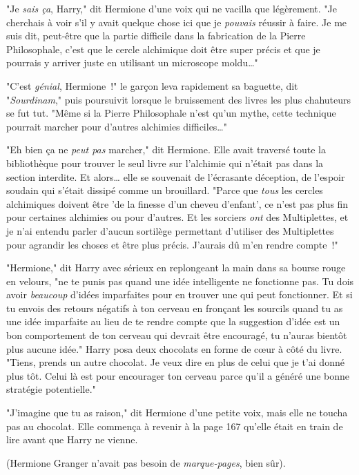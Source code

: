 "Je \emph{sais ça}, Harry," dit Hermione d'une voix qui ne vacilla que légèrement. "Je cherchais à voir s'il y avait quelque chose ici que je \emph{pouvais} réussir à faire. Je me suis dit, peut-être que la partie difficile dans la fabrication de la Pierre Philosophale, c'est que le cercle alchimique doit être super précis et que je pourrais y arriver juste en utilisant un microscope moldu…"

"C'est \emph{génial}, Hermione~!" le garçon leva rapidement sa baguette, dit "\emph{Sourdinam}," puis poursuivit lorsque le bruissement des livres les plus chahuteurs se fut tut. "Même si la Pierre Philosophale n'est qu'un mythe, cette technique pourrait marcher pour d'autres alchimies difficiles…"

"Eh bien ça ne \emph{peut pas} marcher," dit Hermione. Elle avait traversé toute la bibliothèque pour trouver le seul livre sur l'alchimie qui n'était pas dans la section interdite. Et alors… elle se souvenait de l'écrasante déception, de l'espoir soudain qui s'était dissipé comme un brouillard. "Parce que \emph{tous} les cercles alchimiques doivent être 'de la finesse d'un cheveu d'enfant', ce n'est pas plus fin pour certaines alchimies ou pour d'autres. Et les sorciers \emph{ont} des Multiplettes, et je n'ai entendu parler d'aucun sortilège permettant d'utiliser des Multiplettes pour agrandir les choses et être plus précis. J'aurais dû m'en rendre compte~!"

"Hermione," dit Harry avec sérieux en replongeant la main dans sa bourse rouge en velours, "ne te punis pas quand une idée intelligente ne fonctionne pas. Tu dois avoir \emph{beaucoup} d'idées imparfaites pour en trouver une qui peut fonctionner. Et si tu envois des retours négatifs à ton cerveau en fronçant les sourcils quand tu as une idée imparfaite au lieu de te rendre compte que la suggestion d'idée est un bon comportement de ton cerveau qui devrait être encouragé, tu n'auras bientôt plus aucune idée." Harry posa deux chocolats en forme de cœur à côté du livre. "Tiens, prends un autre chocolat. Je veux dire en plus de celui que je t'ai donné plus tôt. Celui là est pour encourager ton cerveau parce qu'il a généré une bonne stratégie potentielle."

"J'imagine que tu as raison," dit Hermione d'une petite voix, mais elle ne toucha pas au chocolat. Elle commença à revenir à la page 167 qu'elle était en train de lire avant que Harry ne vienne.

(Hermione Granger n'avait pas besoin de \emph{marque-pages}, bien sûr).

